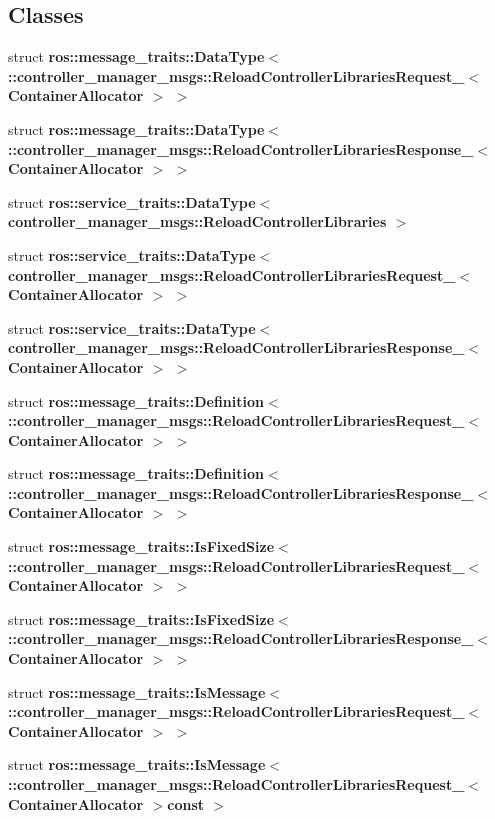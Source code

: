 \subsection*{\-Classes}
\begin{DoxyCompactItemize}
\item 
struct {\bf ros\-::message\-\_\-traits\-::\-Data\-Type$<$ \-::controller\-\_\-manager\-\_\-msgs\-::\-Reload\-Controller\-Libraries\-Request\-\_\-$<$ Container\-Allocator $>$ $>$}
\item 
struct {\bf ros\-::message\-\_\-traits\-::\-Data\-Type$<$ \-::controller\-\_\-manager\-\_\-msgs\-::\-Reload\-Controller\-Libraries\-Response\-\_\-$<$ Container\-Allocator $>$ $>$}
\item 
struct {\bf ros\-::service\-\_\-traits\-::\-Data\-Type$<$ controller\-\_\-manager\-\_\-msgs\-::\-Reload\-Controller\-Libraries $>$}
\item 
struct {\bf ros\-::service\-\_\-traits\-::\-Data\-Type$<$ controller\-\_\-manager\-\_\-msgs\-::\-Reload\-Controller\-Libraries\-Request\-\_\-$<$ Container\-Allocator $>$ $>$}
\item 
struct {\bf ros\-::service\-\_\-traits\-::\-Data\-Type$<$ controller\-\_\-manager\-\_\-msgs\-::\-Reload\-Controller\-Libraries\-Response\-\_\-$<$ Container\-Allocator $>$ $>$}
\item 
struct {\bf ros\-::message\-\_\-traits\-::\-Definition$<$ \-::controller\-\_\-manager\-\_\-msgs\-::\-Reload\-Controller\-Libraries\-Request\-\_\-$<$ Container\-Allocator $>$ $>$}
\item 
struct {\bf ros\-::message\-\_\-traits\-::\-Definition$<$ \-::controller\-\_\-manager\-\_\-msgs\-::\-Reload\-Controller\-Libraries\-Response\-\_\-$<$ Container\-Allocator $>$ $>$}
\item 
struct {\bf ros\-::message\-\_\-traits\-::\-Is\-Fixed\-Size$<$ \-::controller\-\_\-manager\-\_\-msgs\-::\-Reload\-Controller\-Libraries\-Request\-\_\-$<$ Container\-Allocator $>$ $>$}
\item 
struct {\bf ros\-::message\-\_\-traits\-::\-Is\-Fixed\-Size$<$ \-::controller\-\_\-manager\-\_\-msgs\-::\-Reload\-Controller\-Libraries\-Response\-\_\-$<$ Container\-Allocator $>$ $>$}
\item 
struct {\bf ros\-::message\-\_\-traits\-::\-Is\-Message$<$ \-::controller\-\_\-manager\-\_\-msgs\-::\-Reload\-Controller\-Libraries\-Request\-\_\-$<$ Container\-Allocator $>$ $>$}
\item 
struct {\bf ros\-::message\-\_\-traits\-::\-Is\-Message$<$ \-::controller\-\_\-manager\-\_\-msgs\-::\-Reload\-Controller\-Libraries\-Request\-\_\-$<$ Container\-Allocator $>$const  $>$}

\end{DoxyCompactItemize}
